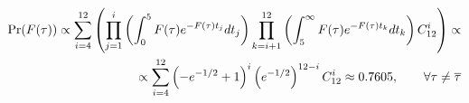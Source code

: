 \documentclass[a4paper,12pt,leqno]{article}
\begin{document}
\begin{equation} \label{eq}
\begin{split}
	\Pr(F(\tau))
	\propto
	\sum_{i=4}^{12} \left(
		\prod_{j=1}^{i} \left(
			\int_{0}^{5} F(\tau)e^{-F(\tau)t_j}dt_j
		\right)
		\prod_{k=i+1}^{12} \left(
			\int_{5}^{\infty} F(\tau) e^{-F(\tau)t_k}dt_k
		\right)
		C_{12}^i
	\right)
	\propto \\
	\propto
	\sum_{i=4}^{12} \left(
		-e^{-1/2}+1
	\right)^i
	\left(
		e^{-1/2}
	\right)^{12-i} C_{12}^i \approx 0.7605,
	\qquad \forall \tau \ne \overline{\tau}  \raisetag{-0pt}
\end{split}
\end{equation}
\end{document}
